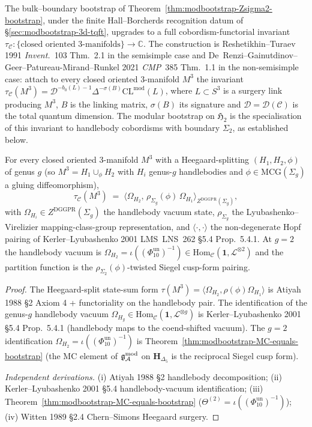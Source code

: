 The bulk--boundary bootstrap of
Theorem~\ref{thm:modbootstrap-Zsigma2-bootstrap}, under the finite
Hall--Borcherds recognition datum of
\S\ref{sec:modbootstrap-3d-tqft}, upgrades to a
full cobordism-functorial invariant $\tau_{\mathcal C}\colon
\{\text{closed oriented 3-manifolds}\}\to\mathbb C$. The construction
is Reshetikhin--Turaev 1991 \emph{Invent.}~103 Thm.~2.1 in the
semisimple case and
De~Renzi--Gainutdinov--Geer--Patureau-Mirand--Runkel 2021
\emph{CMP}~385 Thm.~1.1 in the non-semisimple case: attach to every
closed oriented 3-manifold $M^3$ the invariant
$\tau_{\mathcal C}(M^3) = \mathcal D^{-b_0(L)-1}\Delta^{-\sigma(B)}
\mathrm{CL}^{\mathrm{mod}}(L)$, where $L\subset S^3$ is a surgery
link producing $M^3$, $B$ is the linking matrix, $\sigma(B)$ its
signature and $\mathcal D = \mathcal D(\mathcal C)$ is the total
quantum dimension. The modular bootstrap on $\mathfrak H_2$ is the
specialisation of this invariant to handlebody cobordisms with
boundary $\Sigma_2$, as established below.

\begin{theorem}
\label{thm:modbootstrap-state-sum}
For every closed oriented 3-manifold $M^3$ with a
Heegaard-splitting $(H_1, H_2, \phi)$ of genus $g$ (so
$M^3 = H_1\cup_\phi H_2$ with $H_i$ genus-$g$ handlebodies and
$\phi\in\mathrm{MCG}(\Sigma_g)$ a gluing diffeomorphism),
\[
 \tau_{\mathcal C}(M^3)
 \;=\;
 \bigl\langle\Omega_{H_2},\,\rho_{\Sigma_g}(\phi)\,\Omega_{H_1}
 \bigr\rangle_{Z^{\mathrm{DGGPR}}(\Sigma_g)},
\]
with $\Omega_{H_i}\in Z^{\mathrm{DGGPR}}(\Sigma_g)$ the handlebody
vacuum state, $\rho_{\Sigma_g}$ the Lyubashenko--Virelizier mapping-class-group
representation, and $\langle\cdot,\cdot\rangle$ the non-degenerate
Hopf pairing of Kerler--Lyubashenko 2001 LMS~LNS~262 \S 5.4
Prop.~5.4.1. At $g = 2$ the handlebody vacuum is
$\Omega_{H_2} = \iota((\Phi_{10}^{\mathrm{un}})^{-1})\in
\mathrm{Hom}_{\mathcal C}(\mathbf 1, \mathcal L^{\otimes 2})$ and the
partition function is the $\rho_{\Sigma_2}(\phi)$-twisted Siegel
cusp-form pairing.
\end{theorem}

\begin{proof}
The Heegaard-split state-sum form
$\tau(M^3) = \langle\Omega_{H_2}, \rho(\phi)\Omega_{H_1}\rangle$ is
Atiyah 1988 \S 2 Axiom 4 + functoriality on the handlebody pair.
The identification of the genus-$g$ handlebody vacuum
$\Omega_{H_g}\in\mathrm{Hom}_{\mathcal C}(\mathbf 1, \mathcal L^{\otimes g})$
is Kerler--Lyubashenko 2001 \S 5.4 Prop.~5.4.1 (handlebody maps to
the coend-shifted vacuum). The $g = 2$ identification
$\Omega_{H_2} = \iota((\Phi_{10}^{\mathrm{un}})^{-1})$ is
Theorem~\ref{thm:modbootstrap-MC-equals-bootstrap} (the MC
element of $\mathfrak{g}_{\mathcal{A}}^{\mathrm{mod}}$ on $\mathbf H_{\Delta_5}$ is the reciprocal
Siegel cusp form).

\emph{Independent derivations.}
(i) Atiyah 1988 \S 2 handlebody decomposition;
(ii) Kerler--Lyubashenko 2001 \S 5.4 handlebody-vacuum identification;
(iii) Theorem~\ref{thm:modbootstrap-MC-equals-bootstrap}
($\Theta^{(2)} = \iota((\Phi_{10}^{\mathrm{un}})^{-1})$);
(iv) Witten 1989 \S 2.4 Chern--Simons Heegaard surgery.
\end{proof}

